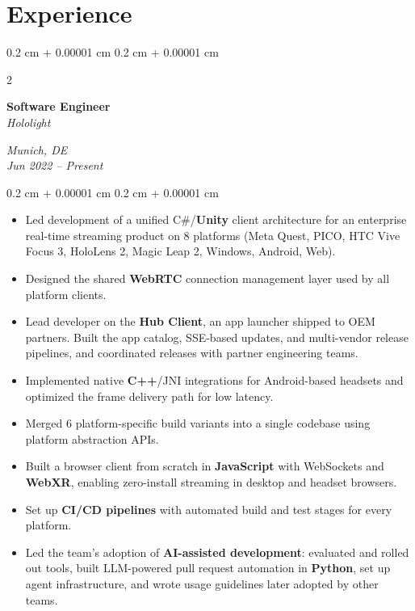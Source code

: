 \documentclass[10pt, a4paper]{article}
\newcommand{\sectionSpacing}{\vspace{0.45cm}}
\newcommand{\elementSpacing}{\vspace{0.20cm}}
\newenvironment{highlights}{
    \begin{itemize}[
        topsep=0.10 cm,
        parsep=0.10 cm,
        partopsep=0pt,
        itemsep=0pt,
        leftmargin=0.4 cm + 10pt
    ]
}{
    \end{itemize}
} %
\newenvironment{onecolentry}{
    \begin{adjustwidth}{
        0.2 cm + 0.00001 cm
    }{
        0.2 cm + 0.00001 cm
    }
}{
    \end{adjustwidth}
} %
\newenvironment{twocolentry}[2][]{
    \onecolentry
    \def\secondColumn{#2}
    \setcolumnwidth{\fill, 4.5 cm}
    \begin{paracol}{2}
}{
    \switchcolumn \raggedleft \secondColumn
    \end{paracol}
    \endonecolentry
} %
\begin{document}
        \sectionSpacing

    \section{Experience}

        \begin{twocolentry}{
        \textit{Munich, DE} \\
        \textit{Jun 2022 -- Present}}
            \textbf{Software Engineer} \\
            \textit{Hololight}
        \end{twocolentry}

        \elementSpacing
        \begin{onecolentry}
            \begin{highlights}
                \item Led development of a unified C\#/\textbf{Unity} client architecture for an enterprise real-time streaming product on 8 platforms (Meta Quest, PICO, HTC Vive Focus 3, HoloLens 2, Magic Leap 2, Windows, Android, Web).
                \item Designed the shared \textbf{WebRTC} connection management layer used by all platform clients.
                \item Lead developer on the \textbf{Hub Client}, an app launcher shipped to OEM partners. Built the app catalog, SSE-based updates, and multi-vendor release pipelines, and coordinated releases with partner engineering teams.
                \item Implemented native \textbf{C++}/JNI integrations for Android-based headsets and optimized the frame delivery path for low latency.
                \item Merged 6 platform-specific build variants into a single codebase using platform abstraction APIs.
                \item Built a browser client from scratch in \textbf{JavaScript} with WebSockets and \textbf{WebXR}, enabling zero-install streaming in desktop and headset browsers.
                \item Set up \textbf{CI/CD pipelines} with automated build and test stages for every platform.
                \item Led the team's adoption of \textbf{AI-assisted development}: evaluated and rolled out tools, built LLM-powered pull request automation in \textbf{Python}, set up agent infrastructure, and wrote usage guidelines later adopted by other teams.
            \end{highlights}
        \end{onecolentry}
\end{document}
